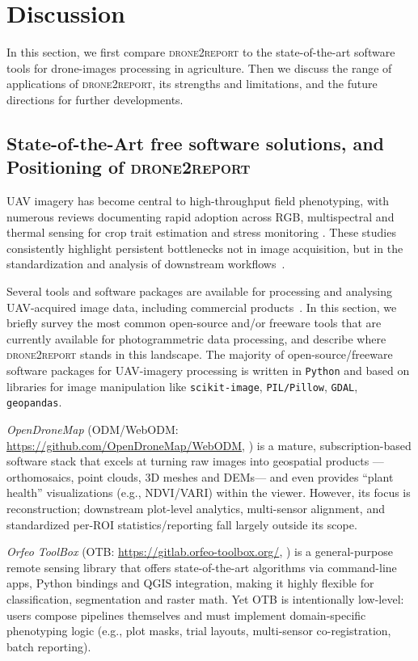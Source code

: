 \documentclass[drones,technicalnote,accept,pdftex,moreauthors]{Definitions/mdpi}
\begin{document}
\section{Discussion}
\label{discussion}
In this section, we first compare \textsc{drone2report} to the state-of-the-art software tools for drone-images processing in agriculture. Then we discuss the range of applications of \textsc{drone2report}, its strengths and limitations, and the future directions for further developments.

\subsection{State-of-the-Art free software solutions, and Positioning of \textsc{drone2report}}
UAV imagery has become central to high-throughput field phenotyping, with numerous reviews documenting rapid adoption across RGB, multispectral and thermal sensing for crop trait estimation and stress monitoring \cite{tanaka_review_2024, gano2024drone}. 
These studies consistently highlight persistent bottlenecks not in image acquisition, but in the standardization and analysis of downstream workflows~\cite{gano_dronebased_2024}.

Several tools and software packages are available for processing and analysing UAV-acquired image data, including commercial products~\cite{sharma2021development}. 
In this section, we briefly survey the most common open-source and/or freeware tools that are currently available for photogrammetric data processing, and describe where \textsc{drone2report} stands in this landscape. 
The majority of open-source/freeware software packages for UAV-imagery processing is written in \texttt{Python} and based on libraries for image manipulation like \texttt{scikit-image}, \texttt{PIL/Pillow}, \texttt{GDAL}, \texttt{geopandas}.

\textit{OpenDroneMap} (ODM/WebODM: \url{https://github.com/OpenDroneMap/WebODM}, \cite{vacca2020web}) is a mature, subscription-based software stack that excels at turning raw images into geospatial products —orthomosaics, point clouds, 3D meshes and DEMs— and even provides “plant health” visualizations (e.g., NDVI/VARI) within the viewer. However, its focus is reconstruction; downstream plot-level analytics, multi-sensor alignment, and standardized per-ROI statistics/reporting fall largely outside its scope.

\textit{Orfeo ToolBox} (OTB: \url{https://gitlab.orfeo-toolbox.org/}, \cite{noauthor_orfeo_nodate, grizonnet_orfeo_2017}) is a general-purpose remote sensing library that offers state-of-the-art algorithms via command-line apps, Python bindings and QGIS integration, making it highly flexible for classification, segmentation and raster math. Yet OTB is intentionally low-level: users compose pipelines themselves and must implement domain-specific phenotyping logic (e.g., plot masks, trial layouts, multi-sensor co-registration, batch reporting). 
\end{document}
